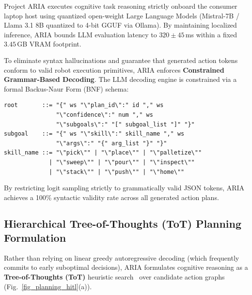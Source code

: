 \documentclass[journal]{IEEEtran}
\begin{document}
Project ARIA executes cognitive task reasoning strictly onboard the consumer laptop host using quantized open-weight Large Language Models (Mistral-7B / Llama 3.1 8B quantized to 4-bit GGUF via Ollama). By maintaining localized inference, ARIA bounds LLM evaluation latency to $320 \pm 45$\,ms within a fixed $3.45$\,GB VRAM footprint.

To eliminate syntax hallucinations and guarantee that generated action tokens conform to valid robot execution primitives, ARIA enforces \textbf{Constrained Grammar-Based Decoding}. The LLM decoding engine is constrained via a formal Backus-Naur Form (BNF) schema:
\begin{verbatim}
root       ::= "{" ws "\"plan_id\":" id "," ws 
               "\"confidence\":" num "," ws 
               "\"subgoals\":" "[" subgoal_list "]" "}"
subgoal    ::= "{" ws "\"skill\":" skill_name "," ws 
               "\"args\":" "{" arg_list "}" "}"
skill_name ::= "\"pick\"" | "\"place\"" | "\"palletize\"" 
             | "\"sweep\"" | "\"pour\"" | "\"inspect\"" 
             | "\"stack\"" | "\"push\"" | "\"home\""
\end{verbatim}
By restricting logit sampling strictly to grammatically valid JSON tokens, ARIA achieves a 100\% syntactic validity rate across all generated action plans.

\subsection{Hierarchical Tree-of-Thoughts (ToT) Planning Formulation}
Rather than relying on linear greedy autoregressive decoding (which frequently commits to early suboptimal decisions), ARIA formulates cognitive reasoning as a \textbf{Tree-of-Thoughts (ToT)} heuristic search~\cite{aria_132_yao_2023_tree} over candidate action graphs (Fig.~\ref{fig_planning_hitl}(a)).
\end{document}
